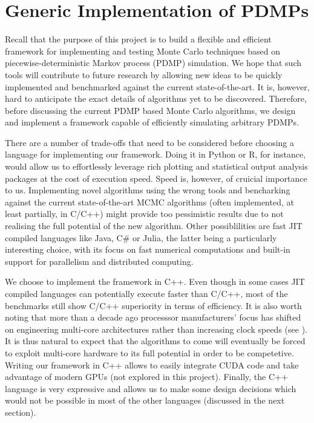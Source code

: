 \documentclass[report.tex]{subfiles}
\begin{document}
\chapter{Generic Implementation of PDMPs}
\label{pdmps-implementation}

Recall that the purpose of this project is to build a flexible and efficient
framework for implementing and testing Monte Carlo techniques based on
piecewise-deterministic Markov process (PDMP) simulation.
We hope that such tools will contribute to future research by allowing
new ideas to be quickly implemented and benchmarked against the current state-of-the-art.
It is, however, hard to anticipate the exact details of algorithms yet to be discovered.
Therefore, before discussing the current PDMP based Monte Carlo algorithms,
we design and implement a framework capable of efficiently simulating
arbitrary PDMPs.

There are a number of trade-offs that need to be considered before choosing a language
for implementing our framework.
Doing it in Python or R, for instance, would allow us to effortlessly leverage rich plotting
and statistical output analysis packages at the cost of execution speed.
Speed is, however, of cruicial importance to us.
Implementing novel algorithms using the wrong tools and bencharking against
the current state-of-the-art MCMC algorithms (often implemented, at least partially,
in C/C++) might provide too pessimistic results due to not realising the full potential
of the new algorithm.
Other possiblilities are fast JIT compiled languages like Java, C\# or Julia,
the latter being a particularly interesting choice, with its focus on fast numerical
computations and built-in support for parallelism and distributed computing.

We choose to implement the framework in C++.
Even though in some cases JIT compiled languages can potentially execute faster than
C/C++, most of the benchmarks still show C/C++ superiority in terms of efficiency.
It is also worth noting that more than a decade ago processsor manufacturers’ focus has shifted on
engineering multi-core architectures rather than increasing clock speeds (see \citet{sutter2005free}).
It is thus natural to expect that the algorithms to come will eventually be
forced to exploit multi-core hardware to its full potential in order to be competetive.
Writing our framework in C++ allows to easily integrate CUDA code and take advantage
of modern GPUs (not explored in this project).
Finally, the C++ language is very expressive and allows us to make some design decisions
which would not be possible in most of the other languages (discussed in the next section).
\end{document}
